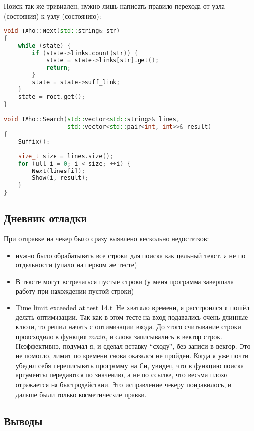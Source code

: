 \documentclass[12pt]{article}
\begin{document}
\noindent Поиск так же тривиален, нужно лишь написать правило перехода от узла (состояния) к узлу (состоянию):
{\scriptsize \begin{lstlisting}[language=c++]
void TAho::Next(std::string& str)
{
    while (state) {
        if (state->links.count(str)) {
            state = state->links[str].get();
            return;
        }
        state = state->suff_link;
    }
    state = root.get();
}

void TAho::Search(std::vector<std::string>& lines, 
                  std::vector<std::pair<int, int>>& result)
{
    Suffix();
    
    size_t size = lines.size();
    for (ull i = 0; i < size; ++i) {
        Next(lines[i]);
        Show(i, result);
    }
}
\end{lstlisting}}

\subsection*{Дневник отладки}  

При отправке на чекер было сразу выявлено нескольно недостатков:
\begin{itemize}
\item нужно было обрабатывать все строки для поиска как цельный текст, а не по отдельности (упало на первом же тесте)
\item  В тексте могут встречаться пустые строки (у меня программа завершала работу при нахождении пустой строки)
\item Time limit exceeded at test 14.t. Не хватило времени, я расстроился и пошёл делать оптимизации.
\subitem  Так как в этом тесте на вход подавались очень длинные ключи, то решил начать с оптимизации ввода. До этого считывание строки происходило в функции $main$, и слова записывались в вектор строк. Неэффективно, подумал я, и сделал вставку ``сходу'', без записи в вектор.
\subitem Это не помогло, лимит по времени снова оказался не пройден. Когда я уже почти убедил себя переписывать программу на Си, увидел, что в функцию поиска аргументы передаются по значению, а не по ссылке, что весьма плохо отражается на быстродействии. Это исправление чекеру понравилось, и дальше были только косметические правки.
\end{itemize}
 


\subsection*{Выводы}
\end{document}
